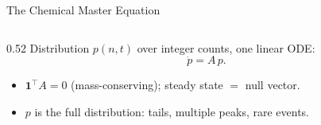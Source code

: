 \documentclass[10pt,aspectratio=169]{beamer}
\begin{document}

\begin{frame}{The Chemical Master Equation}

  \begin{columns}[T]
    \begin{column}{0.52\textwidth}
      Distribution $p(n,t)$ over integer counts, one linear ODE:
      \[ \dot p = A\,p . \]
      \begin{itemize}\setlength\itemsep{0.3em}
        \item $\mathbf 1^\top A=0$ (mass-conserving); steady state $=$ null vector.
        \item $p$ is the full distribution: tails, multiple peaks, rare events.
      \end{itemize}


\end{column}
\end{columns}
\end{frame}
\end{document}
